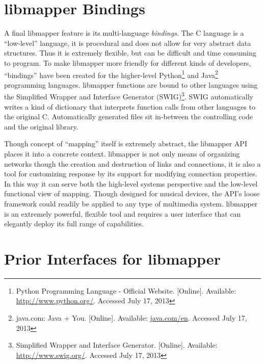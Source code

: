 	\section{libmapper Bindings} %
	\label{sec:libmapper_bindings}

A final libmapper feature is its multi-language \emph{bindings}. The C language is a ``low-level'' language, it is procedural and does not allow for very abstract data structures. Thus it is extremely flexible, but can be difficult and time consuming to program. To make libmapper more friendly for different kinds of developers, ``bindings'' have been created for the higher-level 
Python\footnote{Python Programming Language - Official Website. [Online]. Available: \url{http://www.python.org/}. Accessed July 17, 2013} and Java\footnote{java.com: Java + You. [Online]. Available: \url{java.com/en}. Accessed July 17, 2013} 
programming languages. libmapper functions are bound to other languages using the 
Simplified Wrapper and Interface Generator (SWIG)\footnote{Simplified Wrapper and Interface Generator. [Online]. Available: \url{http://www.swig.org/}. Accessed July 17, 2013}.
SWIG automatically writes a kind of dictionary that interprets function calls from other languages to the original C. Automatically generated files sit in-between the controlling code and the original library. 

Though concept of ``mapping'' itself is extremely abstract, the libmapper API places it into a concrete context. libmapper is not only means of organizing networks though the creation and destruction of links and connections, it is also a tool for customizing response by its support for modifying connection properties. In this way it can serve both the high-level systems perspective and the low-level functional view of mapping. Though designed for musical devices, the API's loose framework could readily be applied to any type of multimedia system. libmapper is an extremely powerful, flexible tool and requires a user interface that can elegantly deploy its full range of capabilities.


\section{Prior Interfaces for libmapper} %
\label{sec:prior_interfaces_for_libmapper}

